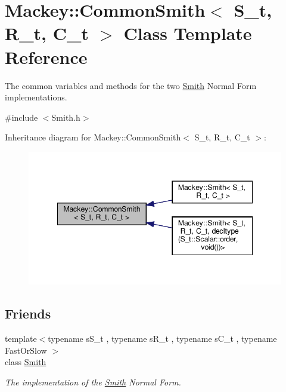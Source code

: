 \hypertarget{classMackey_1_1CommonSmith}{}\section{Mackey\+:\+:Common\+Smith$<$ S\+\_\+t, R\+\_\+t, C\+\_\+t $>$ Class Template Reference}
\label{classMackey_1_1CommonSmith}


The common variables and methods for the two \hyperlink{classMackey_1_1Smith}{Smith} Normal Form implementations.  




{\ttfamily \#include $<$Smith.\+h$>$}



Inheritance diagram for Mackey\+:\+:Common\+Smith$<$ S\+\_\+t, R\+\_\+t, C\+\_\+t $>$\+:\nopagebreak
\begin{figure}[H]
\begin{center}
\leavevmode
\includegraphics[width=348pt]{classMackey_1_1CommonSmith__inherit__graph}
\end{center}
\end{figure}
\subsection*{Friends}
\begin{DoxyCompactItemize}
\item 
{\footnotesize template$<$typename s\+S\+\_\+t , typename s\+R\+\_\+t , typename s\+C\+\_\+t , typename Fast\+Or\+Slow $>$ }\\class \hyperlink{classMackey_1_1CommonSmith_aa10f0f4c3408f3557b07883e86efc88a}{Smith}
\begin{DoxyCompactList}\small\item\em The implementation of the \hyperlink{classMackey_1_1Smith}{Smith} Normal Form. \end{DoxyCompactList}\end{DoxyCompactItemize}



